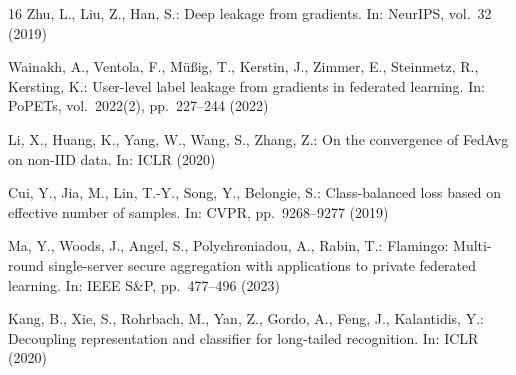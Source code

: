 \documentclass[runningheads]{llncs}
\begin{document}
\begin{thebibliography}{16}
Zhu, L., Liu, Z., Han, S.: Deep leakage from gradients. In: NeurIPS, vol.~32 (2019)

Wainakh, A., Ventola, F., M\"{u}\ss ig, T., Kerstin, J., Zimmer, E., Steinmetz, R., Kersting, K.: User-level label leakage from gradients in federated learning. In: PoPETs, vol.~2022(2), pp.~227--244 (2022)

Li, X., Huang, K., Yang, W., Wang, S., Zhang, Z.: On the convergence of FedAvg on non-IID data. In: ICLR (2020)

Cui, Y., Jia, M., Lin, T.-Y., Song, Y., Belongie, S.: Class-balanced loss based on effective number of samples. In: CVPR, pp.~9268--9277 (2019)

Ma, Y., Woods, J., Angel, S., Polychroniadou, A., Rabin, T.: Flamingo: Multi-round single-server secure aggregation with applications to private federated learning. In: IEEE S\&P, pp.~477--496 (2023)

Kang, B., Xie, S., Rohrbach, M., Yan, Z., Gordo, A., Feng, J., Kalantidis, Y.: Decoupling representation and classifier for long-tailed recognition. In: ICLR (2020)

\end{thebibliography}
\end{document}
